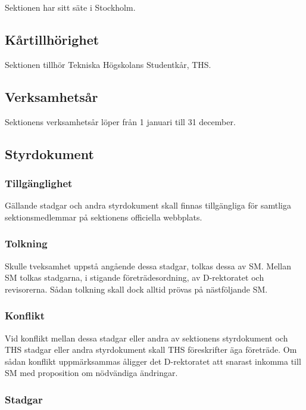\documentclass{dgovdoc}
\begin{document}
Sektionen har sitt säte i Stockholm.

\subsection{Kårtillhörighet}

Sektionen tillhör Tekniska Högskolans Studentkår, THS.

\subsection{Verksamhetsår}

Sektionens verksamhetsår löper från 1 januari till 31 december.

\subsection{Styrdokument}
\label{sec:styrdokument}

\subsubsection{Tillgänglighet}

Gällande stadgar och andra styrdokument skall finnas tillgängliga för samtliga
sektionsmedlemmar på sektionens officiella webbplats.

\subsubsection{Tolkning}

Skulle tveksamhet uppstå angående dessa stadgar, tolkas dessa av SM. Mellan SM
tolkas stadgarna, i stigande företrädesordning, av D-rektoratet och
revisorerna. Sådan tolkning skall dock alltid prövas på nästföljande SM.

\subsubsection{Konflikt}

Vid konflikt mellan dessa stadgar eller andra av sektionens styrdokument och
THS stadgar eller andra styrdokument skall THS föreskrifter äga företräde. Om
sådan konflikt uppmärksammas åligger det D-rektoratet att snarast inkomma till
SM med proposition om nödvändiga ändringar.

\subsubsection{Stadgar}
\end{document}
